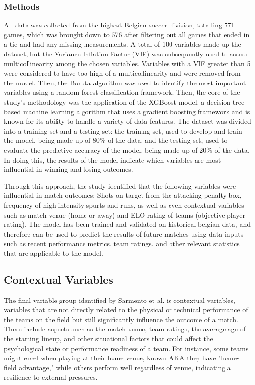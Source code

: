 \subsubsection{Methods}
All data was collected from the highest Belgian soccer division, totalling 771 games, which was brought down to 576 after filtering out all games that ended in a tie and had any missing measurements. A total of 100 variables made up the dataset, 
but the Variance Inflation Factor (VIF) was subsequently used to assess multicollinearity among the chosen variables. Variables with a VIF greater than 5 were considered to have too high of a multicollinearity and were removed from the model. Then, the Boruta algorithm was used to identify the most important variables using a random forest classification framework. Then, the core of the study's methodology was the application of the XGBoost model, a decision-tree-based machine learning algorithm that uses a gradient boosting framework and is known for its ability to handle a variety of data features. The dataset was divided into a training set and a testing set: the training set, used to develop and train the model, being made up of 80\% of the data, and the testing set, used to evaluate the predictive accuracy of the model, being made up of 20\% of the data. In doing this, the results of the model indicate which variables are most influential in winning and losing outcomes. 

Through this approach, the study identified that the following variables were influential in match outcomes: Shots on target from the attacking penalty box, frequency of high-intensity spurts and runs, as well as even contextual variables such as match venue (home or away) and ELO rating of teams (objective player rating). The model has been trained and validated on historical belgian data, and therefore can be used to predict the results of future matches using data inputs such as recent performance metrics, team ratings, and other relevant statistics that are applicable to the model. 

\subsection{Contextual Variables}
The final variable group identified by Sarmento et al. is contextual variables, variables that are not directly related to the physical or technical performance of the teams on the field but still significantly influence the outcome of a match. These include aspects such as the match venue, team ratings, the average age of the starting lineup, and other situational factors that could affect the psychological state or performance readiness of a team. For instance, some teams might excel when playing at their home venue, known AKA they have "home-field advantage," while others perform well regardless of venue, indicating a resilience to external pressures.

